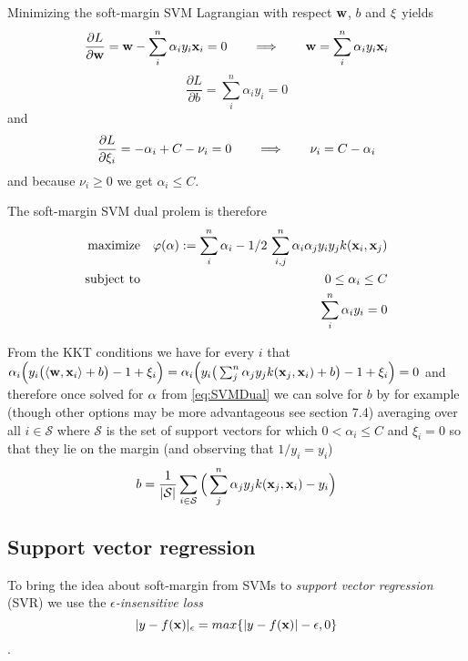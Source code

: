Minimizing the soft-margin SVM Lagrangian with respect $\mathbf{w}$, $b$ and $\mathbf{\xi}$ yields
\begin{equation}
 \frac{\partial{L}}{\partial{\mathbf{w}}} = \mathbf{w} - \sum_i^n \alpha_i y_i \mathbf{x}_i = 0 \qquad \Longrightarrow \qquad \mathbf{w} = \sum_i^n \alpha_i y_i \mathbf{x}_i
\end{equation}
\begin{equation}
 \frac{\partial{L}}{\partial{b}} = \sum_i^n \alpha_i y_i = 0
\end{equation}
and
\begin{equation}
 \frac{\partial{L}}{\partial{\mathbf{\xi}_i}} = - \alpha_i + C-\nu_i = 0 
 \qquad \Longrightarrow \qquad \nu_i = C -\alpha_i
\end{equation}
and because $\nu_i \geq 0$ we get $\alpha_i \leq C$.

The soft-margin SVM dual prolem is therefore
\begin{eqnarray}\label{eq:SoftSVMDual}\index{Soft-margin SVM dual problem}
  \text{maximize}  & & \varphi(\vc{\alpha}):= \sum_i^n \alpha_i - 1/2 \, \sum_{i,j}^n \alpha_i \alpha_j y_i y_j k( \vc{x}_i, \vc{x}_j ) \\
  \text{subject to} & & 0 \leq \alpha_i \leq C \\
   & & \sum_i^n \alpha_i y_i = 0
\end{eqnarray}

From the KKT conditions we have for every $i$ that $ \alpha_i \Big( y_i \big( \langle \mathbf{w},\mathbf{x}_i \rangle + b \big) - 1 + \xi_i \Big) = \alpha_i \Big( y_i \big( \sum_j^n \alpha_j y_j k(\mathbf{x}_j,\mathbf{x}_i) + b \big) - 1 + \xi_i \Big) = 0$ and therefore once solved for $\mathbf{\alpha}$ from \eqref{eq:SVMDual} we can solve for $b$ by for example (though other options may be more advantageous see \cite{Scholkopf2002} section 7.4) averaging over all $i \in \mathcal{S}$ where $\mathcal{S}$ is the set of support vectors for which $0< \alpha_i \leq C$ and $\xi_i = 0$ so that they lie on the margin (and observing that $1/y_i = y_i$)
\begin{equation}\label{eq:SolveForB}
b = \frac{1}{|\mathcal{S}|} \sum_{i \in \mathcal{S}} \Big( \sum_j^n \alpha_j y_j k(\mathbf{x}_j,\mathbf{x}_i) - y_i \Big)
\end{equation}




\subsection{Support vector regression}
To bring the idea about soft-margin from SVMs to \emph{support vector regression} (SVR) we use the \emph{$\epsilon$-insensitive loss}
\begin{equation}\label{eq:EsensitiveLoss}
 |y-f(\mathbf{x})|_{\epsilon} = max \{  |y-f(\mathbf{x})| - \epsilon ,0  \}
\end{equation}.

